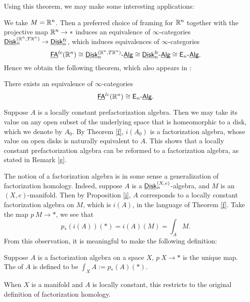 \documentclass[twoside]{article}
\begin{document}
Using this theorem, we may make some interesting applications:

\begin{example}
    We take $M=\mathbb{R}^n$. Then a preferred choice of framing for $\mathbb{R}^n$ together
    with the projective map $\mathbb{R}^n\to*$ induces an equivalence of $\infty$-categories
    $\underline{\smash{\mathsf{Disk}}}_n^{(\mathbb{R}^n,T\mathbb{R}^n)}\to\underline{\smash{\mathsf{Disk}}}_n^{\mathrm{fr}}$, which induces equivalences of
    $\infty$-categories $$\underline{\smash{\mathsf{FA}}}^{lc}(\mathbb{R}^n)\cong\underline{\smash{\mathsf{Disk}}}_n^{(\mathbb{R}^n,T\mathbb{R}^n)}\text{-}\underline{\smash{\mathsf{Alg}}}
    \cong\underline{\smash{\mathsf{Disk}}}_n^{\mathrm{fr}}\text{-}\underline{\smash{\mathsf{Alg}}}\cong\mathsf{E}_n\text{-}\underline{\smash{\mathsf{Alg}}}.$$ Hence we obtain the following theorem,
    which also appears in \cite{Lur16}:

    \begin{theorem}\label{k}
        There exists an equivalence of $\infty$-categories $$\underline{\smash{\mathsf{FA}}}^{lc}(\mathbb{R}^n)\cong\mathsf{E}_n
        \text{-}\underline{\smash{\mathsf{Alg}}}.$$
    \end{theorem}
\end{example}

\begin{example}\label{h}
    Suppose $A$ is a locally constant prefactorization algebra. Then we may take its
    value on any open subset of the underlying space that is homeomorphic to a disk,
    which we denote by $A_0$. By Theorem \ref{f}, $i(A_0)$ is a factorization
    algebra, whose value on open disks is naturally equivalent to $A$. This shows
    that a locally constant prefactorization algebra can be reformed to
    a factorization algebra, as stated in Remark \ref{g}.
\end{example}

\begin{example}
    The notion of a factorization algebra is in some sense a generalization of 
    factorization homology. Indeed, suppose $A$ is a $\underline{\smash{\mathsf{Disk}}}_n^{(X,e)}$-algebra,
    and $M$ is an $(X,e)$-manifold. Then by Proposition \ref{i},
    $A$ corresponds to a locally constant factorization algebra on $M$, which
    is $i(A)$, in the language of Theorem \ref{f}. Take the map $p\:M\to *$,
    we see that $$p_*(i(A))(*)=i(A)(M)=\int_AM.$$ From this observation, 
    it is meaningful to make the following definition:

    \begin{definition}
        Suppose $A$ is a factorization algebra on a space $X$, $p\:X\to *$ is the 
        unique map. The  of $A$ is defined to be 
        $\int_XA:=p_*(A)(*)$.
    \end{definition}

    When $X$ is a manifold and $A$ is locally constant, this restricts to the 
    original definition of factorization homology.
\end{example}
\end{document}
